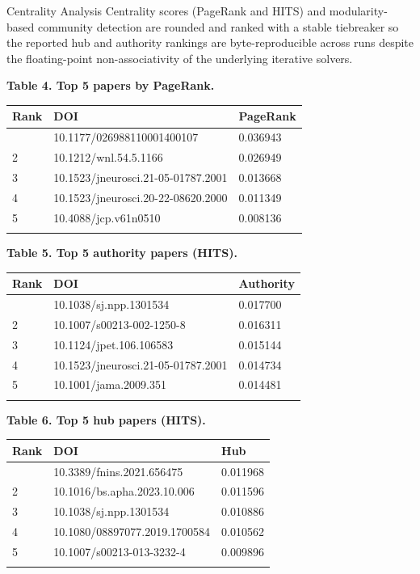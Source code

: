 \documentclass[
  ignorenonframetext,
]{beamer}
\newcounter{none} %
\begin{document}
\begin{frame}[allowframebreaks]{Centrality Analysis}
\protect{}\label{centrality-analysis}
Centrality scores (PageRank  and HITS) and
modularity-based community detection  are
rounded and ranked with a stable tiebreaker so the reported hub and
authority rankings are byte-reproducible across runs despite the
floating-point non-associativity of the underlying iterative solvers.

\textbf{Table 4. Top 5 papers by PageRank.}

{\def\LTcaptype{none} %
\begin{longtable}[]{@{}lll@{}}
\toprule\noalign{}
Rank & DOI & PageRank \\
\midrule\noalign{}
\endhead
1 & 10.1177/026988110001400107 & 0.036943 \\
2 & 10.1212/wnl.54.5.1166 & 0.026949 \\
3 & 10.1523/jneurosci.21-05-01787.2001 & 0.013668 \\
4 & 10.1523/jneurosci.20-22-08620.2000 & 0.011349 \\
5 & 10.4088/jcp.v61n0510 & 0.008136 \\
\bottomrule\noalign{}
\end{longtable}
}

\textbf{Table 5. Top 5 authority papers (HITS).}

{\def\LTcaptype{none} %
\begin{longtable}[]{@{}lll@{}}
\toprule\noalign{}
Rank & DOI & Authority \\
\midrule\noalign{}
\endhead
1 & 10.1038/sj.npp.1301534 & 0.017700 \\
2 & 10.1007/s00213-002-1250-8 & 0.016311 \\
3 & 10.1124/jpet.106.106583 & 0.015144 \\
4 & 10.1523/jneurosci.21-05-01787.2001 & 0.014734 \\
5 & 10.1001/jama.2009.351 & 0.014481 \\
\bottomrule\noalign{}
\end{longtable}
}

\textbf{Table 6. Top 5 hub papers (HITS).}

{\def\LTcaptype{none} %
\begin{longtable}[]{@{}lll@{}}
\toprule\noalign{}
Rank & DOI & Hub \\
\midrule\noalign{}
\endhead
1 & 10.3389/fnins.2021.656475 & 0.011968 \\
2 & 10.1016/bs.apha.2023.10.006 & 0.011596 \\
3 & 10.1038/sj.npp.1301534 & 0.010886 \\
4 & 10.1080/08897077.2019.1700584 & 0.010562 \\
5 & 10.1007/s00213-013-3232-4 & 0.009896 \\
\bottomrule\noalign{}
\end{longtable}
}


\end{frame}
\end{document}
